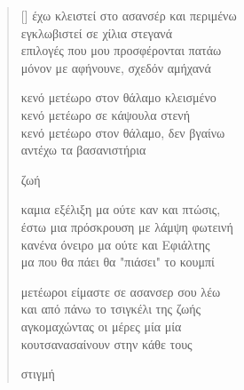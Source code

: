 \documentclass[12pt]{article}
\begin{document}
\newpage

\settowidth{\versewidth}{έχω κλειστεί στο ασανσέρ και}
\begin{verse}[\versewidth]
  έχω κλειστεί στο ασανσέρ και περιμένω \\
  εγκλωβιστεί σε χίλια στεγανά \\
  επιλογές που μου προσφέρονται πατάω \\
  μόνον με αφήνουνε, σχεδόν αμήχανά

  κενό μετέωρο στον θάλαμο κλεισμένο \\
  κενό μετέωρο σε κάψουλα στενή \\
  κενό μετέωρο στον θάλαμο, δεν βγαίνω \\
  αντέχω τα βασανιστήρια

  ζωή

  καμια εξέλιξη μα ούτε καν και πτώσις, \\
  έστω μια πρόσκρουση με λάμψη φωτεινή \\
  κανένα όνειρο μα ούτε και Eφιάλτης \\
  μα που θα πάει θα "πιάσει" το κουμπί

  μετέωροι είμαστε σε ασανσερ σου λέω \\
  και από πάνω το τσιγκέλι της ζωής \\
  αγκομαχώντας οι μέρες μία μία \\
  κουτσανασαίνουν στην κάθε τους

  στιγμή
\end{verse}

\newpage
\end{document}

